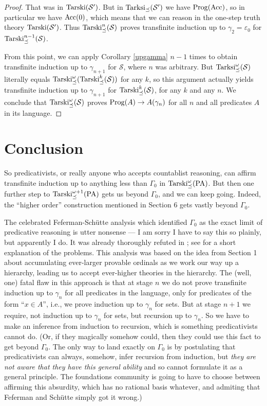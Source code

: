 \documentclass{amsart}
\begin{document}
\begin{proof}
That was in ${\rm Tarski}(\mathcal{S}')$. But in ${\rm Tarksi}_{\preceq}(\mathcal{S}')$ we have
${\rm Prog}({\rm Acc})$, so in particular we have ${\rm Acc}(0)$, which means that we can reason in
the one-step truth theory ${\rm Tarski}(\mathcal{S}')$. Thus ${\rm Tarski}^n_{\preceq}(\mathcal{S})$
proves transfinite induction up to $\gamma_2 = \varepsilon_0$ for
${\rm Tarski}^{n-1}_{\preceq}(\mathcal{S})$.

From this point, we can apply Corollary \ref{upgamma} $n - 1$ times to obtain transfinite induction up
to $\gamma_{n + 1}$ for $\mathcal{S}$, where $n$ was arbitrary. But
${\rm Tarksi}^\omega_{\preceq}(\mathcal{S})$
literally equals ${\rm Tarski}^\omega_{\preceq}({\rm Tarski}^k_{\preceq}(\mathcal{S}))$ for any $k$, so
this argument actually yields transfinite induction up to $\gamma_{n+1}$ for
${\rm Tarski}^k_{\preceq}(\mathcal{S})$, for any $k$ and any $n$.
We conclude that ${\rm Tarski}^\omega_{\preceq}(\mathcal{S})$ proves ${\rm Prog}(A) \to A(\gamma_n)$
for all $n$ and all predicates $A$ in its language.
\end{proof}

\section{Conclusion}

So predicativists, or really anyone who accepts countablist reasoning, can affirm transfinite induction up to
anything less than $\Gamma_0$ in ${\rm Tarski}^\omega_\preceq({\rm PA})$. But then one further step to
${\rm Tarski}^{\omega + 1}_\preceq({\rm PA})$ gets
us beyond $\Gamma_0$, and we can keep going. Indeed, the ``higher order''
construction mentioned in Section 6 gets vastly beyond $\Gamma_0$.

The celebrated Feferman-Sch\"utte analysis which identified $\Gamma_0$ as the exact limit of predicative
reasoning is utter nonsense --- I am sorry I have to say this so plainly, but apparently I do. It was already
thoroughly refuted in \cite{weaver}; see \cite{weaver1} for a short
explanation of the problems. This analysis
was based on the idea from Section 1 about accumulating ever-larger provable ordinals
as we work our way up a hierarchy, leading us to accept ever-higher theories in the hierarchy. The (well, one)
fatal flaw in this approach is that at stage $n$ we do not prove transfinite induction up to $\gamma_n$ for all
predicates in the language, only for predicates of the form ``$x \in A$'', i.e., we prove induction up to
$\gamma_n$ for sets. But at stage $n+1$ we require, not induction up to
$\gamma_n$ for sets, but recursion up to $\gamma_n$. So we have to make an inference from
induction to recursion, which is something predicativists cannot do. (Or, if they magically somehow could,
then they could use this fact to
get beyond $\Gamma_0$. The only way to land exactly on $\Gamma_0$ is by postulating
that predicativists can always, somehow, infer recursion from induction, but {\it they are not aware that
they have this general ability} and so cannot formulate it as a general principle. The foundations community
is going to have to choose between affirming this absurdity, which has no rational basis whatever, and admiting
that Feferman and Sch\"utte simply got it wrong.)
\end{document}

